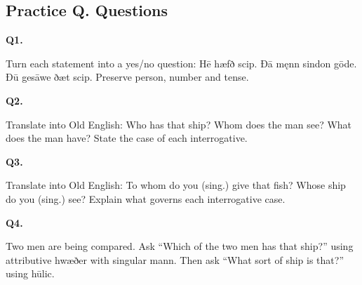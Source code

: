 \subsection*{Practice Q. Questions}

\par\begin{minipage}{\linewidth}\raggedright
\textbf{Q1.}

Turn each statement into a yes/\allowbreak{}no question: Hē hæfð scip. Ðā męnn sindon gōde. Ðū gesāwe ðæt scip. Preserve person, number and tense.

\end{minipage}\par\addvspace{4pt}

\par\begin{minipage}{\linewidth}\raggedright
\textbf{Q2.}

Translate into Old English: Who has that ship? Whom does the man see? What does the man have? State the case of each interrogative.

\end{minipage}\par\addvspace{4pt}

\par\begin{minipage}{\linewidth}\raggedright
\textbf{Q3.}

Translate into Old English: To whom do you (sing.) give that fish? Whose ship do you (sing.) see? Explain what governs each interrogative case.

\end{minipage}\par\addvspace{4pt}

\par\begin{minipage}{\linewidth}\raggedright
\textbf{Q4.}

Two men are being compared. Ask “Which of the two men has that ship?” using attributive hwæðer with singular mann. Then ask “What sort of ship is that?” using hūlic.

\end{minipage}\par\addvspace{4pt}

